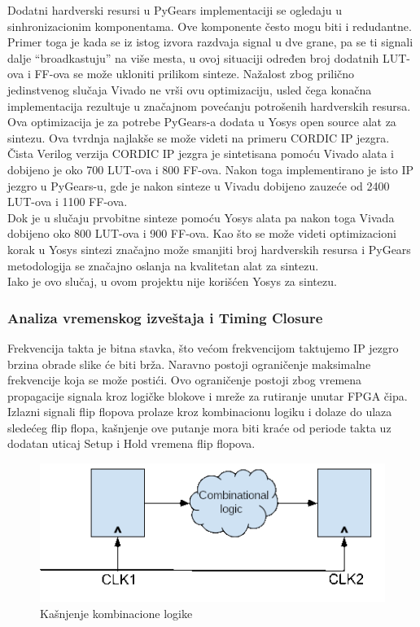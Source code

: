 Dodatni hardverski resursi u PyGears implementaciji se ogledaju u
sinhronizacionim komponentama.
Ove komponente često mogu biti i redudantne.
Primer toga je kada se iz istog izvora razdvaja signal u dve grane, pa se ti
signali dalje ``broadkastuju'' na više mesta, u ovoj situaciji određen broj dodatnih LUT-ova i
FF-ova se može ukloniti prilikom sinteze.
Nažalost zbog prilično jedinstvenog slučaja Vivado ne vrši ovu
optimizaciju, usled čega konačna implementacija rezultuje u značajnom povećanju
potrošenih hardverskih resursa.\\

Ova optimizacija je za potrebe PyGears-a dodata u Yosys open source alat za
sintezu.
Ova tvrdnja najlakše se može videti na primeru CORDIC IP jezgra.
Čista Verilog verzija CORDIC IP jezgra je sintetisana pomoću Vivado alata i
dobijeno je oko 700 LUT-ova i 800 FF-ova.
Nakon toga implementirano je isto IP jezgro u PyGears-u, gde je nakon sinteze u
Vivadu dobijeno zauzeće od 2400 LUT-ova i 1100 FF-ova. \\
Dok je u slučaju prvobitne sinteze pomoću Yosys alata pa nakon toga Vivada
dobijeno oko 800 LUT-ova i 900 FF-ova.
Kao što se može videti optimizacioni korak u Yosys sintezi značajno može
smanjiti broj hardverskih resursa i PyGears metodologija se značajno oslanja na
kvalitetan alat za sintezu. \\
Iako je ovo slučaj, u ovom projektu nije korišćen Yosys za sintezu.


\subsubsection{Analiza vremenskog izveštaja i Timing Closure}

Frekvencija takta je bitna stavka, što većom frekvencijom taktujemo IP jezgro
brzina obrade slike će biti brža.
Naravno postoji ograničenje maksimalne frekvencije koja se može postići.
Ovo ograničenje postoji zbog vremena propagacije signala kroz logičke blokove i mreže za rutiranje unutar FPGA čipa.
Izlazni signali flip flopova prolaze kroz kombinacionu logiku i dolaze do ulaza
sledećeg flip flopa, kašnjenje ove putanje mora biti kraće od periode takta uz
dodatan uticaj Setup i Hold vremena flip flopova.

\begin{figure}[H]
  \centering
  \includegraphics[width=0.55\linewidth]{images/comb.png}
  \caption{Kašnjenje kombinacione logike}
  \label{comb_logic}
\end{figure}


